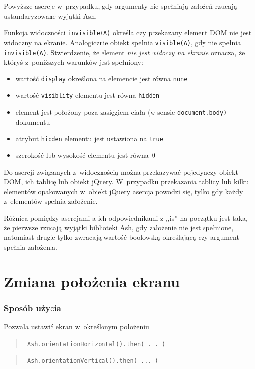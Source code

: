 \documentclass{xmgr}
\begin{document}
Powyższe asercje w~przypadku, gdy argumenty nie spełniają założeń rzucają ustandaryzowane wyjątki Ash. 

Funkcja widoczności \texttt{invisible(A)} określa czy przekazany element DOM nie jest widoczny na ekranie. Analogicznie obiekt spełnia \texttt{visible(A)}, gdy nie spełnia \texttt{invisible(A)}. Stwierdzenie, że element {\it nie jest widoczy na ekranie} oznacza, że któryś z~poniższych warunków jest spełniony:

\begin{itemize}
  \item wartość \texttt{display} określona na elemencie jest równa \texttt{none}
  \item wartość \texttt{visiblity} elementu jest równa \texttt{hidden}
  \item element jest położony poza zasięgiem ciała (w sensie \texttt{document.body)} dokumentu
  \item atrybut \texttt{hidden} elementu jest ustawiona na \texttt{true}
  \item szerokość lub wysokość elementu jest równa~0
\end{itemize}

Do asercji związanych z~widocznością można przekazywać pojedynczy obiekt DOM, ich tablicę lub obiekt jQuery. W~przypadku przekazania tablicy lub kilku elementów opakowanych w~obiekt jQuery asercja powodzi się, tylko gdy każdy z~elementów spełnia założenie. 

Różnica pomiędzy asercjami a ich odpowiednikami z ,,is'' na początku jest taka, że pierwsze rzucają wyjątki biblioteki Ash, gdy założenie nie jest spełnione, natomiast drugie tylko zwracają wartość boolowską określającą czy argument spełnia założenia.  

\section{Zmiana położenia ekranu}

\subsubsection{Sposób użycia}
Pozwala ustawić ekran w~określonym położeniu

\begin{quote}
  \texttt{  Ash.orientationHorizontal().then( ... )  }
\end{quote}

\begin{quote}
  \texttt{  Ash.orientationVertical().then( ... )  } 
\end{quote}
\end{document}
